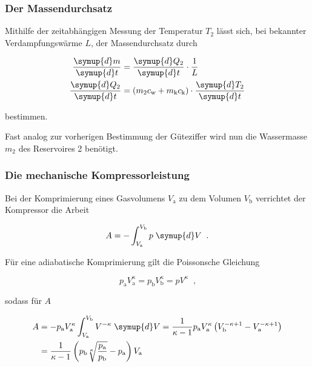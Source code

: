 \subsubsection{Der Massendurchsatz}

Mithilfe der zeitabhängigen Messung der Temperatur $T_2$ lässt sich, bei 
bekannter Verdampfungswärme $L$, der Massendurchsatz durch

\begin{align}
    \frac{\symup{d} m}{\symup{d}t} &= \frac{\symup{d} Q_2}{\symup{d}t} \cdot
    \frac{1}{L} \\
    \frac{\symup{d} Q_2}{\symup{d}t} &= (m_2 c_\text{w} + m_\text{k} c_\text{k})
    \cdot \frac{\symup{d} T_2}{\symup{d}t}
\end{align}

bestimmen.

Fast analog zur vorherigen Bestimmung der Güteziffer wird nun die Wassermasse
$m_2$ des Reservoires 2 benötigt.


\subsubsection{Die mechanische Kompressorleistung}

Bei der Komprimierung eines Gasvolumens $V_\text{a}$ zu dem Volumen $V_\text{b}$ 
verrichtet der Kompressor die Arbeit

\begin{equation}
    A = - \int^{V_\text{b}}_{V_\text{a}} p \; \symup{d}V \; \; \text{.}
\end{equation}

Für eine adiabatische Komprimierung gilt die Poissonsche Gleichung

\begin{equation}
    p_\text{a} V^\kappa_\text{a} = p_\text{b} V^\kappa_\text{b} = p V^\kappa \; \;
    \text{,}
\end{equation}

sodass für $A$ 

\begin{equation}
    \begin{split}
        A &= - p_\text{a} V^\kappa_\text{a} \int^{V_\text{b}}_{V_\text{a}} V^{-\kappa}
        \; \symup{d}V = \frac{1}{\kappa - 1} p_\text{a} V^\kappa_\text{a} \left(
        V^{-\kappa + 1}_\text{b} - V^{-\kappa + 1}_\text{a} \right) \\
        &= \frac{1}{\kappa - 1} \left(p_\text{b} \sqrt[\kappa]{
        \frac{p_\text{a}}{p_\text{b}}} - p_\text{a}\right) V_\text{a}
    \end{split}
\end{equation}

